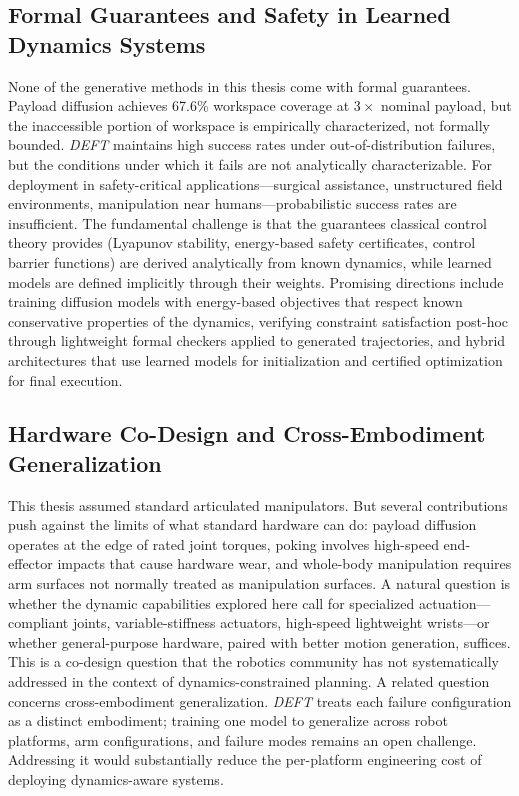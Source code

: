 \subsection{Formal Guarantees and Safety in Learned Dynamics Systems}
\label{sec:discussion:guarantees}

None of the generative methods in this thesis come with formal guarantees.
Payload diffusion achieves 67.6\% workspace coverage at $3\times$ nominal payload, but the inaccessible portion of workspace is empirically characterized, not formally bounded.
\textit{DEFT} maintains high success rates under out-of-distribution failures, but the conditions under which it fails are not analytically characterizable.
For deployment in safety-critical applications---surgical assistance, unstructured field environments, manipulation near humans---probabilistic success rates are insufficient.
The fundamental challenge is that the guarantees classical control theory provides (Lyapunov stability, energy-based safety certificates, control barrier functions) are derived analytically from known dynamics, while learned models are defined implicitly through their weights.
Promising directions include training diffusion models with energy-based objectives that respect known conservative properties of the dynamics, verifying constraint satisfaction post-hoc through lightweight formal checkers applied to generated trajectories, and hybrid architectures that use learned models for initialization and certified optimization for final execution.

\subsection{Hardware Co-Design and Cross-Embodiment Generalization}
\label{sec:discussion:actuation}

This thesis assumed standard articulated manipulators.
But several contributions push against the limits of what standard hardware can do: payload diffusion operates at the edge of rated joint torques, poking involves high-speed end-effector impacts that cause hardware wear, and whole-body manipulation requires arm surfaces not normally treated as manipulation surfaces.
A natural question is whether the dynamic capabilities explored here call for specialized actuation---compliant joints, variable-stiffness actuators, high-speed lightweight wrists---or whether general-purpose hardware, paired with better motion generation, suffices.
This is a co-design question that the robotics community has not systematically addressed in the context of dynamics-constrained planning.
A related question concerns cross-embodiment generalization.
\textit{DEFT} treats each failure configuration as a distinct embodiment; training one model to generalize across robot platforms, arm configurations, and failure modes remains an open challenge.
Addressing it would substantially reduce the per-platform engineering cost of deploying dynamics-aware systems.